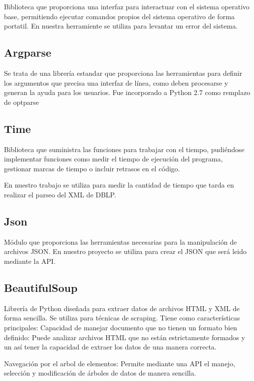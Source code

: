 \documentclass[a4paper, 12pt]{book}
\begin{document}
Biblioteca que proporciona una interfaz para interactuar con el sistema operativo base, permitiendo ejecutar comandos propios del sistema operativo de forma portatil. En nuestra herramiente se utiliza para levantar un error del sistema.

\subsection{Argparse}

Se trata de una librería estandar que proporciona las herramientas para definir los argumentos que precisa una interfaz de línea, como deben procesarse y generan la ayuda para los usuarios. Fue incorporado a Python 2.7 como remplazo de optparse

\subsection{Time}

Biblioteca que suministra las funciones para trabajar con el tiempo, pudiéndose implementar funciones como medir el tiempo de ejecución del programa, gestionar marcas de tiempo o incluir retrasos en el código.

En nuestro trabajo se utiliza para medir la cantidad de tiempo que tarda en realizar el parseo del XML de DBLP.

\subsection{Json}

Módulo que proporciona las herramientas necesarias para la manipulación de archivos JSON. En nuestro proyecto se utiliza para crear el JSON que será leido mediante la API.

\subsection{BeautifulSoup}
Librería de Python diseñada para extraer datos de archivos HTML y XML de forma sencilla. Se utiliza para técnicas de scraping.
Tiene como características principales:
Capacidad de manejar documento que no tienen un formato bien definido: Puede analizar archivos HTML que no están estrictamente formados y un así tener la capacidad de extraer los datos de una manera correcta.

Navegación por el arbol de elementos: Permite mediante una API el manejo, selección y modificación de árboles de datos de manera sencilla.
\end{document}

